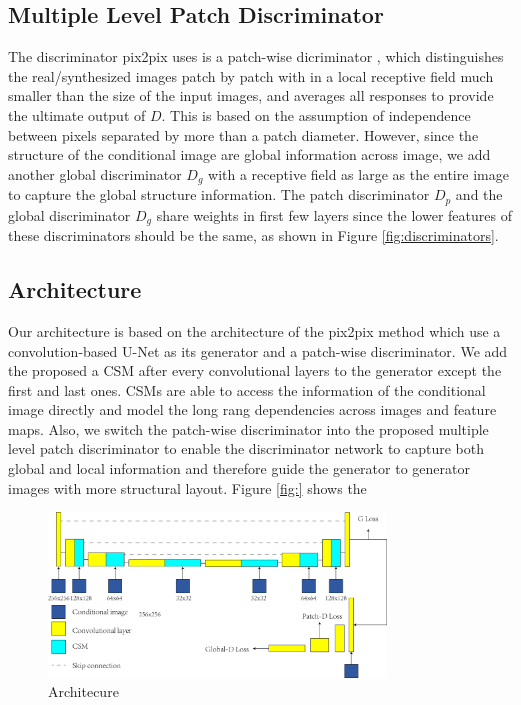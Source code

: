 \subsection{Multiple Level Patch Discriminator}
The discriminator pix2pix uses is a patch-wise dicriminator \cite{PatchGANs}, which distinguishes the real/synthesized images patch by patch with in a local receptive field much smaller than the size of the input images, and averages all responses to provide the ultimate output of $D$. This is based on the assumption of independence between pixels separated by more than a patch diameter. However, since the structure of the conditional image are global information across image, we add another global discriminator $D_g$ with a receptive field as large as the entire image to capture the global structure information. The patch discriminator $D_p$ and the global discriminator $D_g$ share weights in first few layers since the lower features of these discriminators should be the same, as shown in Figure \ref{fig:discriminators}.
%
%
\subsection{Architecture}
Our architecture is based on the architecture of the pix2pix method which use a convolution-based U-Net \cite{Unet} as its generator and a patch-wise discriminator. We add the proposed a CSM after every convolutional layers to the generator except the first and last ones. CSMs are able to access the information of the conditional image directly and model the long rang dependencies across images and feature maps. Also, we switch the patch-wise discriminator into the proposed multiple level patch discriminator to enable the discriminator network to capture both global and local information and therefore guide the generator to generator images with more structural layout.  
Figure \ref{fig:} shows the 
%
\begin{figure}
	\label{fig:architecture}
	\includegraphics[width=0.8\textwidth]{figures/architecture}
	\caption{Architecure}
\end{figure}

